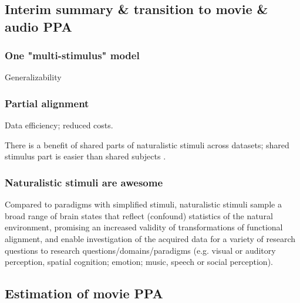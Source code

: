 \subsection{Interim summary \& transition to movie \& audio PPA}


\subsubsection{One "multi-stimulus" model}


Generalizability



\subsubsection{Partial alignment}


%
Data efficiency; reduced costs.

%
There is a benefit of shared parts of naturalistic stimuli across datasets;
shared stimulus part is easier than shared subjects
\citep[e.g.][]{zhang2018transfer}.


\subsubsection{Naturalistic stimuli are awesome}

Compared to paradigms with simplified stimuli, naturalistic stimuli sample a
broad range of brain states \citep{guntupalli2016model, haxby2011common} that
reflect (confound) statistics of the natural environment, promising an increased
validity of transformations of functional alignment, and enable investigation of
the acquired data for a variety of research questions to research
questions/domains/paradigms (e.g.  visual or auditory perception, spatial
cognition; emotion; music, speech or social perception).



\subsection{Estimation of movie PPA}



